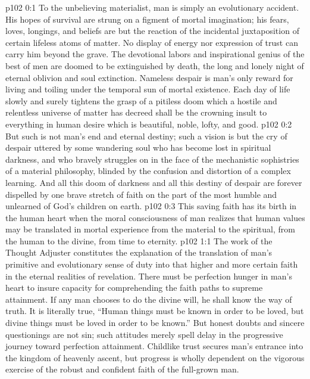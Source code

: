 \author{Melchizedek}
\vs p102 0:1 To the unbelieving materialist, man is simply an evolutionary accident. His hopes of survival are strung on a figment of mortal imagination; his fears, loves, longings, and beliefs are but the reaction of the incidental juxtaposition of certain lifeless atoms of matter. No display of energy nor expression of trust can carry him beyond the grave. The devotional labors and inspirational genius of the best of men are doomed to be extinguished by death, the long and lonely night of eternal oblivion and soul extinction. Nameless despair is man’s only reward for living and toiling under the temporal sun of mortal existence. Each day of life slowly and surely tightens the grasp of a pitiless doom which a hostile and relentless universe of matter has decreed shall be the crowning insult to everything in human desire which is beautiful, noble, lofty, and good.
\vs p102 0:2 But such is not man’s end and eternal destiny; such a vision is but the cry of despair uttered by some wandering soul who has become lost in spiritual darkness, and who bravely struggles on in the face of the mechanistic sophistries of a material philosophy, blinded by the confusion and distortion of a complex learning. And all this doom of darkness and all this destiny of despair are forever dispelled by one brave stretch of faith on the part of the most humble and unlearned of God’s children on earth.
\vs p102 0:3 This saving faith has its birth in the human heart when the moral consciousness of man realizes that human values may be translated in mortal experience from the material to the spiritual, from the human to the divine, from time to eternity.
\vs p102 1:1 The work of the Thought Adjuster constitutes the explanation of the translation of man’s primitive and evolutionary sense of duty into that higher and more certain faith in the eternal realities of revelation. There must be perfection hunger in man’s heart to insure capacity for comprehending the faith paths to supreme attainment. If any man chooses to do the divine will, he shall know the way of truth. It is literally true, “Human things must be known in order to be loved, but divine things must be loved in order to be known.” But honest doubts and sincere questionings are not sin; such attitudes merely spell delay in the progressive journey toward perfection attainment. Childlike trust secures man’s entrance into the kingdom of heavenly ascent, but progress is wholly dependent on the vigorous exercise of the robust and confident faith of the full\hyp{}grown man.
